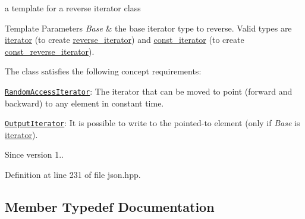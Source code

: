 a template for a reverse iterator class 


\begin{DoxyTemplParams}{Template Parameters}
{\em Base} & the base iterator type to reverse. Valid types are \hyperlink{classnlohmann_1_1basic__json_ae3c77a8f03096da2a32a3de0c317d445}{iterator} (to create \hyperlink{classnlohmann_1_1basic__json_a2f1f83aa187a56dc5ec7a7027065ac8a}{reverse\+\_\+iterator}) and \hyperlink{classnlohmann_1_1basic__json_a2b53a089e945e75deaac6782aa942a77}{const\+\_\+iterator} (to create \hyperlink{classnlohmann_1_1basic__json_ae336fff01f4b78e3e16e5008dc8dbc00}{const\+\_\+reverse\+\_\+iterator}).\\
\hline
\end{DoxyTemplParams}
The class satisfies the following concept requirements\+:
\begin{DoxyItemize}
\item \href{http://en.cppreference.com/w/cpp/concept/RandomAccessIterator}{\tt Random\+Access\+Iterator}\+: The iterator that can be moved to point (forward and backward) to any element in constant time.
\item \href{http://en.cppreference.com/w/cpp/concept/OutputIterator}{\tt Output\+Iterator}\+: It is possible to write to the pointed-\/to element (only if {\itshape Base} is \hyperlink{classnlohmann_1_1basic__json_ae3c77a8f03096da2a32a3de0c317d445}{iterator}).
\end{DoxyItemize}

\begin{DoxySince}{Since}
version 1.. 
\end{DoxySince}


Definition at line 231 of file json.\+hpp.



\subsection{Member Typedef Documentation}
\hypertarget{classnlohmann_1_1basic__json_1_1json__reverse__iterator_a9ebc4c99e6fc90c965af0f39ad2ca70e}{}

